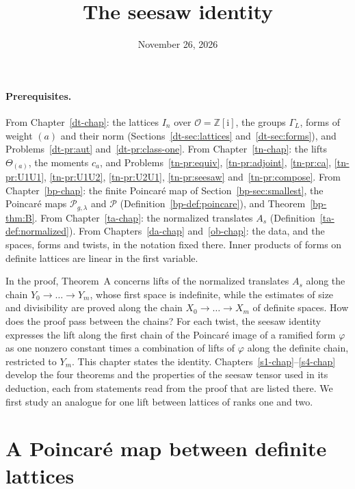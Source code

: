 \documentclass[reqno]{amsart}
\title{The seesaw identity}
\author{}
\date{November 26, 2026}
\newcounter{chap}
\theoremstyle{definition}
\theoremstyle{plain}
\newcommand{\Z}{\mathbb{Z}}
\newcommand{\ii}{\mathrm{i}}
\newcommand{\Oc}{\mathcal{O}}
\newcommand{\Pc}{\mathcal{P}}
\begin{document}
\maketitle
{}\label{chap}

\paragraph{Prerequisites.}
From Chapter~\ref{dt-chap}: the lattices \(I_n\) over \(\Oc = \Z[\ii]\), the groups \(\Gamma_L\), forms of weight \((a)\) and their norm (Sections~\ref{dt-sec:lattices} and~\ref{dt-sec:forms}), and Problems~\ref{dt-pr:aut} and~\ref{dt-pr:class-one}.  From Chapter~\ref{tn-chap}: the lifts \(\Theta_{(a)}\), the moments \(c_a\), and Problems~\ref{tn-pr:equiv}, \ref{tn-pr:adjoint}, \ref{tn-pr:ca}, \ref{tn-pr:U1U1}, \ref{tn-pr:U1U2}, \ref{tn-pr:U2U1}, \ref{tn-pr:seesaw} and~\ref{tn-pr:compose}.  From Chapter~\ref{bp-chap}: the finite Poincar\'e map of Section~\ref{bp-sec:smallest}, the Poincar\'e maps \(\Pc_{g,\lambda}\) and \(\Pc\) (Definition~\ref{bp-def:poincare}), and Theorem~\ref{bp-thm:B}.  From Chapter~\ref{ta-chap}: the normalized translates \(A_s\) (Definition~\ref{ta-def:normalized}).  From Chapters~\ref{da-chap} and~\ref{ob-chap}: the data, and the spaces, forms and twists, in the notation fixed there.  Inner products of forms on definite lattices are linear in the first variable.

\medskip
In the proof, Theorem~A concerns lifts of the normalized translates \(A_s\) along the chain \(Y_0 \to \dots \to Y_m\), whose first space is indefinite, while the estimates of size and divisibility are proved along the chain \(X_0 \to \dots \to X_m\) of definite spaces.  How does the proof pass between the chains?  For each twist, the seesaw identity expresses the lift along the first chain of the Poincar\'e image of a ramified form \(\varphi\) as one nonzero constant times a combination of lifts of \(\varphi\) along the definite chain, restricted to \(Y_m\).  This chapter states the identity.  Chapters~\ref{s1-chap}--\ref{s4-chap} develop the four theorems and the properties of the seesaw tensor used in its deduction, each from statements read from the proof that are listed there.  We first study an analogue for one lift between lattices of ranks one and two.


\section{A Poincar\'e map between definite lattices}\label{sec:toy}
\end{document}
